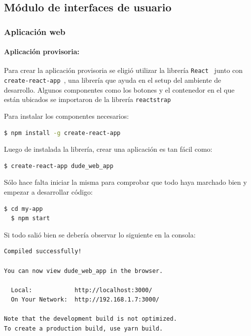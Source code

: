 \subsection{Módulo de interfaces de usuario}

\subsubsection{Aplicación web}

\paragraph{Aplicación provisoria:}

Para crear la aplicación provisoria se eligió utilizar la librería \lstinline[columns=fixed]{React}~ junto con \lstinline[columns=fixed]{create-react-app}~\cite{c-r-a}, una librería que ayuda en el setup del ambiente de desarrollo. Algunos componentes como los botones y el contenedor en el que están ubicados se importaron de la librería \lstinline[columns=fixed]{reactstrap}~\cite{reactstrap}

Para instalar los componentes necesarios:

\begin{lstlisting}[language=bash]  
  $ npm install -g create-react-app
\end{lstlisting}

Luego de instalada la librería, crear una aplicación es tan fácil como:

\begin{lstlisting}[language=bash]  
  $ create-react-app dude_web_app
\end{lstlisting}

Sólo hace falta iniciar la misma para comprobar que todo haya marchado bien y empezar a desarrollar código:

\begin{lstlisting}[language=bash] 
  $ cd my-app
  $ npm start
\end{lstlisting}

Si todo salió bien se debería observar lo siguiente en la consola:

\begin{lstlisting}[language=bash] 
Compiled successfully!

You can now view dude_web_app in the browser.

  Local:            http://localhost:3000/
  On Your Network:  http://192.168.1.7:3000/

Note that the development build is not optimized.
To create a production build, use yarn build.
\end{lstlisting}

